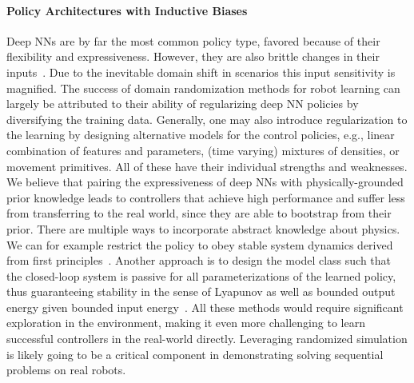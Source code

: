 \documentclass[utf8]{frontiersSCNS} %
\begin{document}
\paragraph*{Policy Architectures with Inductive Biases}
Deep \acp{NN} are by far the most common policy type, favored because of their flexibility and expressiveness. 
However, they are also brittle \wrt changes in their inputs~\citep{Szegedy_Fergus_13,Goodfellow_Szegedy_14,Huang_Abbeel_17}.
Due to the inevitable domain shift in \simtoreal scenarios this input sensitivity is magnified.
The success of domain randomization methods for robot learning can largely be attributed to their ability of regularizing deep \ac{NN} policies by diversifying the training data.
Generally, one may also introduce regularization to the learning by designing alternative models for the control policies, e.g., linear combination of features and parameters, (time varying) mixtures of densities, or movement primitives.
All of these have their individual strengths and weaknesses.
We believe that pairing the expressiveness of deep \acp{NN} with physically-grounded prior knowledge leads to controllers that achieve high performance and suffer less from transferring to the real world, since they are able to bootstrap from their prior.
There are multiple ways to incorporate abstract knowledge about physics. 
We can for example restrict the policy to obey stable system dynamics derived from first principles~\citep{Greydanus_Yosinski_19,Lutter_Peters_19}.
Another approach is to design the model class such that the closed-loop system is passive for all parameterizations of the learned policy, thus guaranteeing stability in the sense of Lyapunov as well as bounded output energy given bounded input energy~\citep{Brogliato_07,Yang_Ma_13,Dai_Tedrake_21}. All these methods would require significant exploration in the environment, making it even more challenging to learn successful controllers in the real-world directly. Leveraging randomized simulation is likely going to be a critical component in demonstrating solving sequential problems on real robots.

\end{document}
